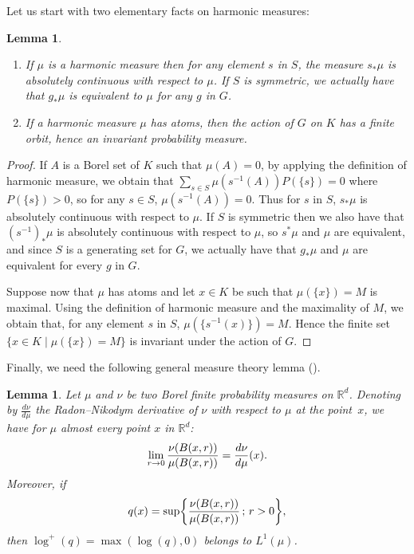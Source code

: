 \documentclass[10pt]{amsart}
\newtheorem{lemm}[theo]{Lemma}\newtheorem{prop}[theo]{Proposition}\newtheorem{coro}[theo]{Corollary}\newtheorem{conj}[theo]{Conjecture}
\theoremstyle{definition}\newtheorem{defi}[theo]{Definition}\newtheorem{rema}[theo]{Remark}\newtheorem{exam}[theo]{Example}\newtheorem{exem}[theo]{Example}\newtheorem{nota}[theo]{Notation}
\newcommand{\R}{\mathbb{R}}
\renewcommand*{\to}{\mathchoice{\longrightarrow}{\rightarrow}{\rightarrow}{\rightarrow}}
\let\originalleft\left
\let\originalright\right
\renewcommand{\left}{\mathopen{}\mathclose\bgroup\originalleft}
\renewcommand{\right}{\aftergroup\egroup\originalright}
\begin{document}
Let us start with two elementary facts on harmonic measures:

\begin{lemm}\leavevmode
\label{acatoms}
\begin{enumerate}
\item\label{lemm3.3.1} If $\mu$ is a harmonic measure then for any element $s$ in $S$, the measure $s_{*} \mu$ is absolutely continuous with respect to $\mu$. If $S$ is symmetric, we actually have that $g_*\mu$ is equivalent to $\mu$ for any $g$ in $G$.
\item\label{lemm3.3.2} If a harmonic measure $\mu$ has atoms, then the action of $G$ on $K$ has a finite orbit, hence an invariant probability measure.
\end{enumerate}
\end{lemm}

\begin{proof}
If $A$ is a Borel set of $K$ such that $\mu(A)=0$, by applying the definition of harmonic measure, we obtain that $\sum _{s \in S} \mu(s^{-1}(A))P(\{ s \})=0$ where $P(\{s\})>0$, so for any $s \in S$, $\mu(s^{-1}(A))=0$. Thus for $s$ in $S$, $s_*\mu$ is absolutely continuous with respect to $\mu$. If $S$ is symmetric then we also have that $(s^{-1})_*\mu$ is absolutely continuous with respect to $\mu$, so $s^*\mu$ and $\mu$ are equivalent, and since $S$ is a generating set for $G$, we actually have that $g_*\mu$ and $\mu$ are equivalent for every $g$ in $G$.

Suppose now that $\mu$ has atoms and let $x\in K$ be such that $\mu(\{ x \})=M$ is maximal. Using the definition of harmonic measure and the maximality of $M$, we obtain that, for any element $s$ in $S$, $\mu(\{ s^{-1}(x) \})=M$. Hence the finite set $\{ x \in K \mid \mu(\{ x \})=M \}$ is invariant under the action of $G$.
\end{proof}

Finally, we need the following general measure theory lemma (\cite[Proposition~5]{Led}).


\begin{lemm}\label{generaltheory}
Let $\mu$ and $\nu$ be two Borel finite probability measures on $\R^d$. Denoting by $\frac{d\nu}{d \mu}$ the Radon--Nikodym derivative of $\nu$ with respect to $\mu$ at the point~$x$, we have for $\mu$ almost every point $x$ in $\R^d$:
\[
\lim_{ r\to 0 } \frac{\nu(B(x,r))}{\mu(B(x,r))}=\frac{d\nu}{d \mu}(x).
\]
Moreover, if
\[
q(x)= \sup \left\{ \frac{\nu(B(x,r))}{\mu(B(x,r))} \,;\, r>0 \right\},
\]
then $\log^{+}(q)= \max(\log(q),0)$ belongs to $L^{1}(\mu)$.
\end{lemm}
\end{document}
